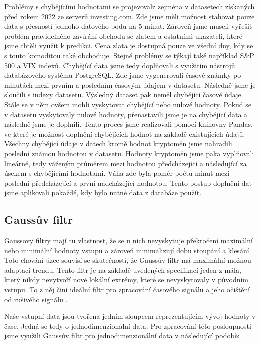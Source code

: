 Problémy s chybějícími hodnotami se projevovalz zejména v datasetech získaných před rokem 2022 ze serverů investing.com. 
Zde jsme měli možnost stahovat pouze data s přesností jednoho datového bodu na 5 minut. 
Zároveň jsme museli vyřešit problém pravidelného zavírání obchodu se zlatem a ostatními ukazateli, které jsme chtěli využít k predikci. 
Cena zlata je dostupná pouze ve všední dny, kdy se s touto komoditou také obchoduje. 
Stejné problémy se týkají také například S\&P 500 a VIX indexů.
Chybějící data jsme tedy doplňovali s využitím nástrojů databázového systému PostgreSQL. 
Zde jsme vygenerovali časové známky po minutách mezi prvním a posledním časovým údajem v datasetu. 
Následně jsme je sloučili s indexy datasetu. 
Výsledný dataset pak neměl chybějící časové údaje.
Stále se v něm ovšem mohli vyskytovat chybějící nebo nulové hodnoty. 
Pokud se v datasetu vyskytovaly nulové hodnoty, přenastavili jsme je na chybějící data a následně jsme je doplnili.
Tento proces jsme realizovali pomocí knihovny Pandas, ve které je možnost doplnění chybějících hodnot na základě existujících údajů. 
Všechny chybějící údaje v datech kromě hodnot kryptoměn jsme nahradili poslední známou hodnotou v datasetu. 
Hodnoty kryptoměn jsme paka vyplňovali lineárně, tedy váženým průměrem mezi hodnotou předcházející a následující za úsekem s chybějícími hodnotami. 
Váha zde byla poměr počtu minut mezi poslední předcházející a první nadcházející hodnotou.
Tento postup doplnění dat jsme aplikovali pokaždé, kdy bylo nutné data z databáze použít.

\newpage

\subsection{Gaussův filtr}

Gaussovy filtry mají tu vlastnost, že se u nich nevyskytuje překročení maximální nebo minimální hodnoty vstupu a zároveň minimalizují dobu stoupání a klesání. 
Toto chování úzce souvisí se skutečností, že Gaussův filtr má maximální možnou adaptaci trendu. 
Tento filtr je na základě uvedených specifikací jeden z mála, který nikdy nevytvoří nové lokální extrémy, které se nevyskytovaly v původním vstupu. 
To z něj činí ideální filtr pro zpracování časového signálu a jeho očištění od rušivého signálu \cite{gauss}.

Naše vstupní data jsou tvořena jedním sloupcem reprezentujícím vývoj hodnoty v čase. 
Jedná se tedy o jednodimenzionální data. 
Pro zpracování této posloupnosti jsme využili Gaussův filtr pro jednodimenzionální data v následující podobě:

